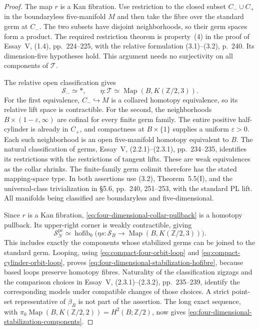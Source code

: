 \begin{proof}
The map $r$ is a Kan fibration.  Use restriction to the closed subset
$C_-\cup C_+$ in the boundaryless five-manifold $M$ and then take
the fibre over the standard germ at $C_-$.  The two subsets have
disjoint neighborhoods, so their germ spaces form a product.
The required restriction theorem is property~(4) in the proof of
Essay~V, (1.4), pp.~224--225, with the relative formulation (3.1)--(3.2),
p.~240.  Its dimension-five hypotheses hold.  This argument needs
no surjectivity on all components of $\mathcal T$.

The relative open classification gives
\begin{equation}\label{eq:one-ended-structure-classification}
 \mathcal S_-\simeq *,\qquad
 \eta:\mathcal T\simeq\operatorname{Map}(B,K(\mathbb Z/2,3)).
\end{equation}
For the first equivalence, $C_-\hookrightarrow M$ is a collared
homotopy equivalence, so its relative lift space is contractible.
For the second, the neighborhoods
$B\times(1-\varepsilon,\infty)$ are cofinal for every finite germ
family.  The entire positive half-cylinder is already in $C_+$,
and compactness at $B\times\{1\}$ supplies a uniform
$\varepsilon>0$.  Each such neighborhood is an open five-manifold
homotopy equivalent to $B$.  The natural classification of germs,
Essay~V, (2.2.1)--(2.3.1), pp.~234--235, identifies its restrictions
with the restrictions of tangent lifts.  These are weak equivalences
as the collar shrinks.  The finite-family germ colimit therefore has
the stated mapping-space type.  In both assertions use (3.2),
Theorem~5.5(I), and the universal-class trivialization in \S5.6,
pp.~240, 251--253, with the standard PL lift.  All manifolds being
classified are boundaryless and five-dimensional.

Since $r$ is a Kan fibration, \eqref{eq:four-dimensional-collar-pullback}
is a homotopy pullback.  Its upper-right corner is weakly
contractible, giving
\[
 \mathcal S_N^{\mathrm{pc}}\simeq
 \operatorname{hofib}_0\bigl(
     \eta s:\mathcal S_B\to
       \operatorname{Map}(B,K(\mathbb Z/2,3))\bigr).
\]
This includes exactly the components whose stabilized germs can be
joined to the standard germ.  Looping, using
\eqref{eq:compact-four-orbit-loop} and
\eqref{eq:compact-cylinder-orbit-loop}, proves
\eqref{eq:four-dimensional-stabilization-hofibre}, because based
loops preserve homotopy fibres.  Naturality of the classification
zigzags and the comparison choices in Essay~V, (2.3.1)--(2.3.2),
pp.~235--239, identify the corresponding models under compatible
changes of those choices.  A strict point-set representative of
$\beta_B$ is not part of the assertion.  The long exact sequence,
with $\pi_0\operatorname{Map}(B,K(\mathbb Z/2,2))=H^2(B;\mathbb Z/2)$,
now gives \eqref{eq:four-dimensional-stabilization-components}.


\end{proof}
